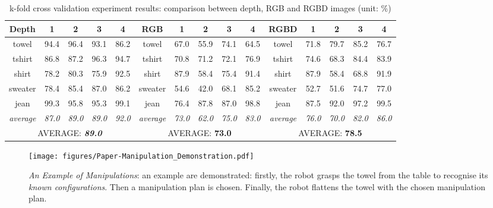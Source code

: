 \documentclass[conference]{IEEEtran}
\begin{document}
\begin{table*}[t]
    \centering
    \caption{k-fold cross validation experiment results: comparison between depth, RGB and RGBD images (unit: \%)}
    \label{tab:result_comparison}
    \begin{tabular}{|c|c|c|c|c||c|c|c|c|c||c|c|c|c|c|}
    \hline
     \textbf{Depth}  & 1 & 2 & 3 & 4 & \textbf{RGB} & 1 & 2 & 3 & 4 &\textbf{RGBD}  & 1 & 2 & 3 & 4\\ \hline
     towel &94.4&96.4&93.1& 86.2& towel & 67.0& 55.9& 74.1& 64.5 &towel & 71.8 & 79.7 & 85.2 & 76.7\\ \hline
     tshirt &86.8& 87.2&96.3 & 94.7 & tshirt & 70.8& 71.2& 72.1& 76.9 &tshirt & 74.6 & 68.3 & 84.4 & 83.9\\ \hline
     shirt &78.2& 80.3&75.9 & 92.5 & shirt & 87.9& 58.4& 75.4& 91.4 &shirt & 87.9 & 58.4 & 68.8 & 91.9\\ \hline
     sweater &78.4& 85.4 &87.0 &86.2& sweater & 54.6& 42.0& 68.1& 85.2 &sweater & 52.7 & 51.6 & 74.7 & 77.0\\ \hline
     jean &99.3 & 95.8& 95.3&99.1& jean & 76.4&87.8 & 87.0& 98.8 &jean & 87.5 & 92.0 & 97.2 & 99.5\\ \hline
     \textit{average} & \textit{87.0} & \textit{89.0} & \textit{89.0}& \textit{92.0} & \textit{average} &\textit{73.0}& \textit{62.0} & \textit{75.0} & \textit{83.0} &\textit{average} & \textit{76.0} & \textit{70.0} & \textit{82.0}& \textit{86.0} \\ \hline
     \multicolumn{5}{|c|}{AVERAGE: \textit{\textbf{89.0}}}&  \multicolumn{5}{|c|}{AVERAGE: \textbf{73.0}} & \multicolumn{5}{|c|}{AVERAGE: \textbf{78.5}}\\
     \hline
    \end{tabular}
\end{table*}

\begin{figure*}[thbp]
    \centering
    \texttt{[image: figures/Paper-Manipulation\_Demonstration.pdf]}
    \caption{\textit{An Example of Manipulations}: an example are demonstrated: firstly, the robot grasps the towel from the table to recognise its \textit{known configurations}. Then a manipulation plan is chosen. Finally, the robot flattens the towel with the chosen manipulation plan.}
    \label{fig:examples_manipulation}
\end{figure*}

\end{document}
